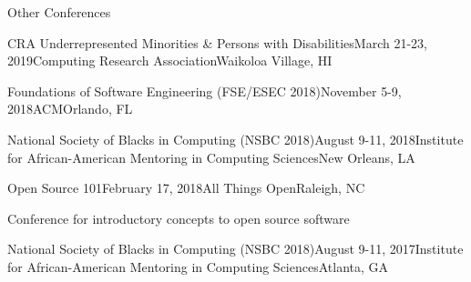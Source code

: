 \documentclass{resume} %
\begin{document}
\begin{rSection}{Other Conferences}

\begin{rSubsection}{CRA Underrepresented Minorities \& Persons with Disabilities}{March 21-23, 2019}{Computing Research Association}{Waikoloa Village, HI}
\item
\end{rSubsection}
\begin{rSubsection}{Foundations of Software Engineering (FSE/ESEC 2018)}{November 5-9, 2018}{ACM}{Orlando, FL}
\item
\end{rSubsection}
\begin{rSubsection}{National Society of Blacks in Computing (NSBC 2018)}{August 9-11, 2018}{Institute for African-American Mentoring in Computing Sciences}{New Orleans, LA}
\item
\end{rSubsection}
\begin{rSubsection}{Open Source 101}{February 17, 2018}{All Things Open}{Raleigh, NC}
\item Conference for introductory concepts to open source software
\end{rSubsection}
\begin{rSubsection}{National Society of Blacks in Computing (NSBC 2018)}{August 9-11, 2017}{Institute for African-American Mentoring in Computing Sciences}{Atlanta, GA}
\item
\end{rSubsection}
\end{rSection}

\end{document}

